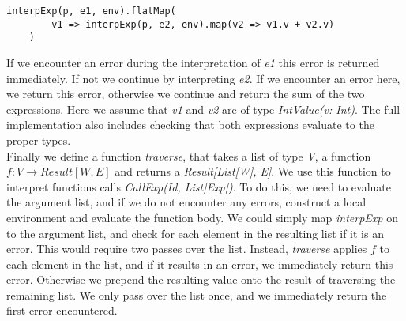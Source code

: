 \begin{lstlisting}[style=simple]
	interpExp(p, e1, env).flatMap(
		v1 => interpExp(p, e2, env).map(v2 => v1.v + v2.v)
	)
\end{lstlisting}
If we encounter an error during the interpretation of \textsl{e1} this error is returned immediately. If not we continue by interpreting \textsl{e2}. If we encounter an error here, we return this error, otherwise we continue and return the sum of the two expressions. Here we assume that \textsl{v1} and \textsl{v2} are of type \textsl{IntValue(v: Int)}. The full implementation also includes checking that both expressions evaluate to the proper types.
\\
Finally we define a function \textsl{traverse}, that takes a list of type \textsl{V}, a function $f: V \rightarrow Result[W, E]$ and returns a \textsl{Result[List[W], E]}. We use this function to interpret functions calls \textsl{CallExp(Id, List[Exp])}. To do this, we need to evaluate the argument list, and if we do not encounter any errors, construct a local environment and evaluate the function body. We could simply map \textsl{interpExp} on to the argument list, and check for each element in the resulting list if it is an error. This would require two passes over the list. Instead, \textsl{traverse} applies $f$ to each element in the list, and if it results in an error, we immediately return this error. Otherwise we prepend the resulting value onto the result of traversing the remaining list. We only pass over the list once, and we immediately return the first error encountered.
